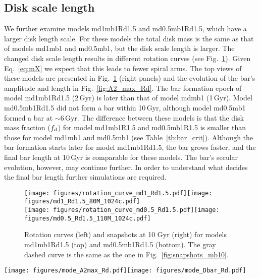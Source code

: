 \subsection{Disk scale length}

We further examine models md1mb1Rd1.5 and md0.5mb1Rd1.5, which
have a larger disk length scale. For these models the total disk mass is the same 
as that of models md1mb1 and md0.5mb1, but the disk scale length 
is larger. The changed disk scale length results in different rotation 
curves (see Fig.~\ref{fig:snapshots_Rdisk}). Given  Eq.~\ref{eq:mX} we expect 
that this leads to fewer spiral arms. The top views of these models are presented in
Fig.~\ref{fig:snapshots_Rdisk} (right panels) and the evolution of 
the bar's amplitude and length in Fig.~\ref{fig:A2_max_Rd}. 
The bar formation epoch of model md1mb1Rd1.5 (2\,Gyr) is
later than that of model mdmb1 (1\,Gyr). Model md0.5mb1Rd1.5 did not form 
a bar within 10\,Gyr, although model md0.5mb1 formed a bar at $\sim6$\,Gyr.
The difference
between these models is that the disk mass fraction ($f_{\rm d}$) for model
md1mb1R1.5 and md0.5mb1R1.5 is smaller than those for model md1mb1 
and md0.5mb1 (see Table~\ref{tb:bar_crit}).
Although the bar formation starts later for model md1mb1Rd1.5, the bar grows
faster, and 
the final bar length at 10\,Gyr is comparable for these models.
The bar's secular evolution, however, may continue further. 
In order to understand what decides the final bar length further simulations
are required. 


\begin{figure}
\texttt{[image: figures/rotation\_curve\_md1\_Rd1.5.pdf]}\texttt{[image: figures/md1\_Rd1.5\_80M\_1024c.pdf]}\\
\texttt{[image: figures/rotation\_curve\_md0.5\_Rd1.5.pdf]}\texttt{[image: figures/md0.5\_Rd1.5\_110M\_1024c.pdf]}\\
    \caption{Rotation curves (left) and snapshots at 10 Gyr (right) for models md1mb1Rd1.5 (top) and md0.5mb1Rd1.5 (bottom). 
    The gray dashed curve is the same as the one in Fig.~\ref{fig:snapshots_mb10}. \label{fig:snapshots_Rdisk}}
\end{figure}


\begin{figure*}
\texttt{[image: figures/mode\_A2max\_Rd.pdf]}\texttt{[image: figures/mode\_Dbar\_Rd.pdf]}
\caption{Same as Fig.~\ref{fig:A2_max_mdisk}, but now for models md1mb1Rd1.5 and md0.5mb1Rd1.5 with md1mb1 shown as reference.
\label{fig:A2_max_Rd}}
\end{figure*}

